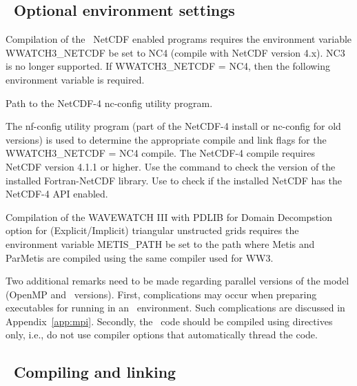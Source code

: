 \vssub
\subsection{~Optional environment settings}
\vssub

Compilation of the \ws\ NetCDF enabled programs requires the environment variable
{\code WWATCH3\_NETCDF} be set to {\code NC4} (compile with NetCDF version 4.x).  
{\code NC3} is no longer supported. 
If {\code WWATCH3\_NETCDF = NC4}, then the following environment variable
is required.
\begin{clist}
 {Path to the NetCDF-4 nc-config utility program.}
\end{clist}
The {\file nf-config} utility program (part of the NetCDF-4 install or 
{\file nc-config} for old versions) is used to determine the appropriate
compile and link flags for the {\code WWATCH3\_NETCDF = NC4} compile.
The NetCDF-4 compile requires NetCDF version 4.1.1 or higher.  Use the command
 to check the version of the installed 
Fortran-NetCDF library. Use  to check if the
installed NetCDF has the NetCDF-4 API enabled.

\vspace{\baselineskip} 
\noindent
Compilation of the WAVEWATCH III with PDLIB for Domain Decompstion option
for (Explicit/Implicit) triangular unstructed grids requires the environment
variable {\code METIS\_PATH} be set to the path where {\code Metis} and
{\code ParMetis} are compiled using the same compiler used for WW3.

\vspace{\baselineskip}
\noindent
Two additional remarks need to be made regarding parallel versions of the
model (OpenMP and \mpi\ versions). First, complications may occur when
preparing executables for running in an \mpi\ environment. Such complications
are discussed in Appendix~\ref{app:mpi}. Secondly, the \omp\ code should be
compiled using directives only, i.e., do not use compiler options that
automatically thread the code.



\vssub
\subsection{~Compiling and linking} \label{sec:comp}
\vssub

